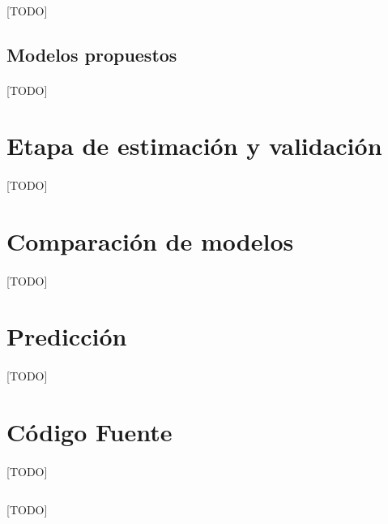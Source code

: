 \documentclass[a4paper, spanish]{article}
\begin{document}
    \paragraph{}
    [TODO]

    \subsection{Modelos propuestos}
    \label{sec:proposed_models}

      \paragraph{}
      [TODO]

  \section{Etapa de estimación y validación}
  \label{sec:fitting}

    \paragraph{}
    [TODO]

  \section{Comparación de modelos}
  \label{sec:comparison}

    \paragraph{}
    [TODO]

  \section{Predicción}
  \label{sec:prediction}

    \paragraph{}
    [TODO]

  \appendix
  \section{Código Fuente}
  \label{sec:code}

    \paragraph{}
    [TODO]


    \begin{listing}[H]
        \centering
        \inputminted{R}{./res/code/weight-loss.r}
        \caption{[TODO]}
        \label{}
      \end{listing}
\end{document}
